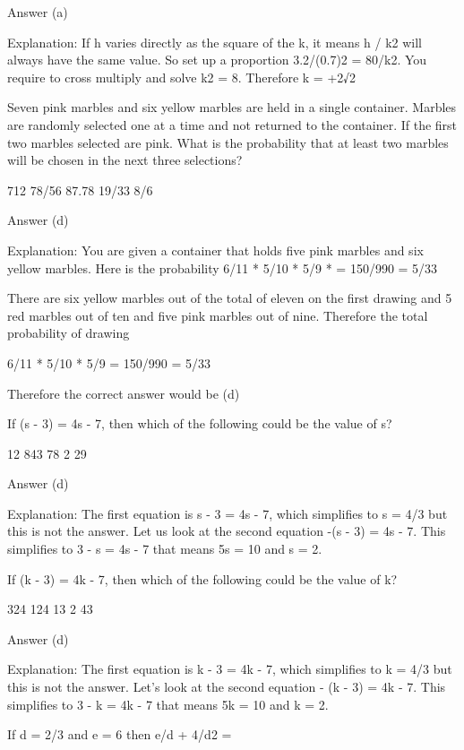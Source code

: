     Answer (a)

    Explanation: If h varies directly as the square of the k, it means h / k2 will always have the same value. So set up a proportion 3.2/(0.7)2 = 80/k2. You require to cross multiply and solve k2 = 8. Therefore k = +2√2 



    Seven pink marbles and six yellow marbles are held in a single container. Marbles are randomly selected one at a time and not returned to the container. If the first two marbles selected are pink. What is the probability that at least two marbles will be chosen in the next three selections?

        712
        78/56
        87.78
        19/33
        8/6 

    Answer (d)

    Explanation: You are given a container that holds five pink marbles and six yellow marbles. Here is the probability 6/11 * 5/10 * 5/9 * = 150/990 = 5/33

    There are six yellow marbles out of the total of eleven on the first drawing and 5 red marbles out of ten and five pink marbles out of nine. Therefore the total probability of drawing

    6/11 * 5/10 * 5/9 = 150/990 = 5/33

    Therefore the correct answer would be (d)

    If (s - 3) = 4s - 7, then which of the following could be the value of s?

        12
        843
        78
        2
        29 

    Answer (d)

    Explanation: The first equation is s - 3 = 4s - 7, which simplifies to s = 4/3 but this is not the answer. Let us look at the second equation -(s - 3) = 4s - 7. This simplifies to 3 - s = 4s - 7 that means 5s = 10 and s = 2.

    If (k - 3) = 4k - 7, then which of the following could be the value of k?

        324
        124
        13
        2
        43 

    Answer (d)

    Explanation: The first equation is k - 3 = 4k - 7, which simplifies to k = 4/3 but this is not the answer. Let's look at the second equation - (k - 3) = 4k - 7. This simplifies to 3 - k = 4k - 7 that means 5k = 10 and k = 2.

    If d = 2/3 and e = 6 then e/d + 4/d2 =

